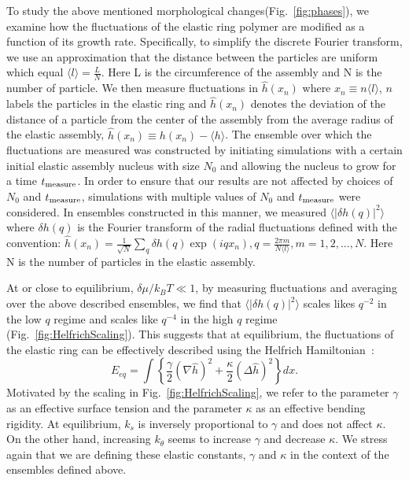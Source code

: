 \documentclass[amsmath,preprintnumbers,10pt,nofootinbib,prl,twocolumn]{revtex4-1}
\begin{document}
To study the above mentioned morphological changes(Fig.~\ref{fig:phases}), we examine how the fluctuations of the elastic ring polymer are modified as a function of its growth rate. Specifically, to simplify the discrete Fourier transform, we use an approximation that the distance between the particles are uniform which equal $\langle l \rangle=\frac{L}{N}$. Here L is the circumference of the assembly and N is the number of particle. We then measure fluctuations in $\hat{h}(x_n)$ where $x_n\equiv n\langle l \rangle$, $n$ labels the particles in the elastic ring and $\hat{h}(x_n)$ denotes the deviation of the distance of a particle from the center of the assembly from the average radius of the elastic assembly, $\hat{h}(x_n)\equiv h(x_n) -\langle h \rangle$. The ensemble over which the fluctuations are measured was constructed by initiating simulations with a certain initial elastic assembly nucleus with size $N_0$ and allowing the nucleus to grow for a time $t_{\rm measure}$. In order to ensure that our results are not affected by choices of $N_0$ and $t_{\rm measure}$, simulations with multiple values of $N_0$ and $t_{\rm measure}$ were considered. In ensembles constructed in this manner, we measured $\langle |\delta h(q)|^2 \rangle$ where $\delta h(q)$ is the Fourier transform of the radial fluctuations defined with the convention: $\hat{h}(x_n)=\frac{1}{\sqrt{N}}\sum _q \delta h(q) \exp(iqx_n), q = \frac{2\pi m}{N\langle l \rangle}, m = 1, 2,...,N$. Here N is the number of particles in the elastic assembly. 

At or close to equilibrium, $\delta \mu /k_B T \ll 1$, by measuring fluctuations and averaging over the above described ensembles, we find that $\langle |\delta h(q)|^2 \rangle$ scales likes $q^{-2}$ in the low $q$ regime and scales like $q^{-4}$ in the high $q$ regime (Fig.~\ref{fig:HelfrichScaling}). This suggests that 
at equilibrium, the fluctuations of the elastic ring can be effectively described using the Helfrich Hamiltonian~\cite{W.Helfrich1973}:
\begin{equation}
E_{eq}=\int \left \{\frac{\gamma}{2} (\nabla \hat{h})^2+  \frac{\kappa}{2} (\Delta \hat{h})^2\right \} dx.
\label{eq:Helfrich}
\end{equation}
Motivated by the scaling in Fig.~\ref{fig:HelfrichScaling}, we refer to the parameter $\gamma$ as an effective surface tension and the parameter $\kappa$ as an effective bending rigidity. At equilibrium, $k_s$ is inversely proportional to $\gamma$ and does not affect $\kappa$. On the other hand, increasing $k_\theta$ seems to increase $\gamma$ and decrease $\kappa$. We stress again that we are defining these elastic constants, $\gamma$ and $\kappa$ in the context of the ensembles defined above. 
\end{document}
